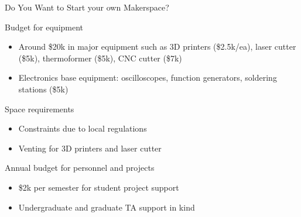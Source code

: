\documentclass[xcolor=table,compress,professionalfonts,pdfpagelabels]{beamer}
\begin{document}
\begin{frame}{Do You Want to Start your own Makerspace?}
 \begin{block}{Budget for equipment}
  \begin{itemize}
   \item Around \$20k in major equipment such as 3D printers (\$2.5k/ea), laser cutter (\$5k), thermoformer (\$5k), CNC cutter (\$7k)
   \item Electronics base equipment: oscilloscopes, function generators, soldering stations (\$5k)
  \end{itemize}
 \end{block}
 \begin{block}{Space requirements}
  \begin{itemize}
   \item Constraints due to local regulations
   \item Venting for 3D printers and laser cutter
  \end{itemize}
 \end{block}
 \begin{block}{Annual budget for personnel and projects}
  \begin{itemize}
   \item \$2k per semester for student project support
   \item Undergraduate and graduate TA support in kind
  \end{itemize}
 \end{block}
\end{frame}
\end{document}
